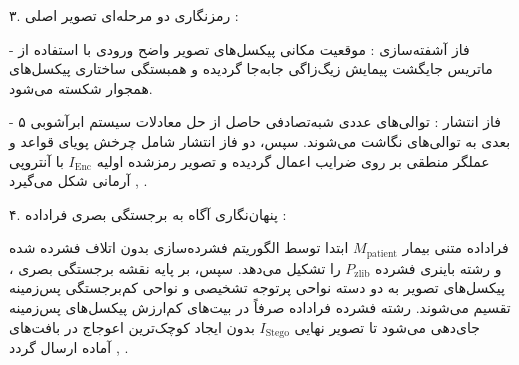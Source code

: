 ۳. رمزنگاری دو مرحله‌ای تصویر اصلی :\par

{-} فاز آشفته‌سازی : موقعیت مکانی پیکسل‌های تصویر واضح ورودی با استفاده از ماتریس جایگشت پیمایش زیگ‌زاگی  جابه‌جا گردیده و همبستگی ساختاری پیکسل‌های همجوار شکسته می‌شود.\par

{-} فاز انتشار : توالی‌های عددی شبه‌تصادفی حاصل از حل معادلات سیستم ابرآشوبی ۵ بعدی به توالی‌های  نگاشت می‌شوند. سپس، دو فاز انتشار شامل چرخش پویای قواعد   و عملگر منطقی  بر روی ضرایب اعمال گردیده و تصویر رمزشده اولیه $I_{\mathrm{Enc}}$ با آنتروپی آرمانی شکل می‌گیرد , .\par



۴. پنهان‌نگاری آگاه به برجستگی بصری فراداده :\par

فراداده متنی بیمار $M_{\mathrm{patient}}$ ابتدا توسط الگوریتم فشرده‌سازی بدون اتلاف  فشرده شده و رشته باینری فشرده $P_{\mathrm{zlib}}$ را تشکیل می‌دهد. سپس، بر پایه نقشه برجستگی بصری ، پیکسل‌های تصویر به دو دسته نواحی پرتوجه تشخیصی  و نواحی کم‌برجستگی پس‌زمینه  تقسیم می‌شوند. رشته فشرده فراداده صرفاً در بیت‌های کم‌ارزش  پیکسل‌های پس‌زمینه جای‌دهی می‌شود تا تصویر نهایی $I_{\mathrm{Stego}}$ بدون ایجاد کوچک‌ترین اعوجاج در بافت‌های  آماده ارسال گردد , .\par




